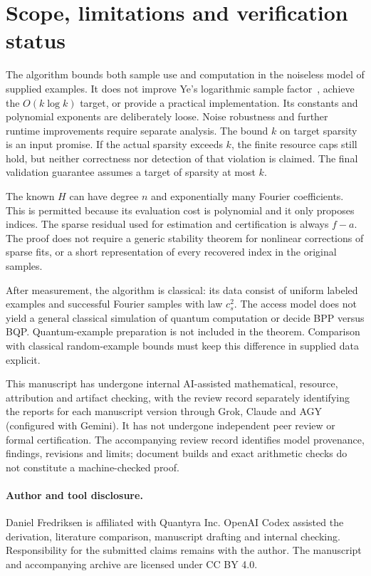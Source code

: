 \documentclass[11pt]{article}
\theoremstyle{remark}\newtheorem{remark}[theorem]{Remark}
\begin{document}
\section{Scope, limitations and verification status}
The algorithm bounds both sample use and computation in the noiseless model of supplied examples. It does not improve Ye's logarithmic sample factor~\cite{Ye}, achieve the $O(k\log k)$ target, or provide a practical implementation. Its constants and polynomial exponents are deliberately loose. Noise robustness and further runtime improvements require separate analysis. The bound $k$ on target sparsity is an input promise. If the actual sparsity exceeds $k$, the finite resource caps still hold, but neither correctness nor detection of that violation is claimed. The final validation guarantee assumes a target of sparsity at most $k$.

The known $H$ can have degree $n$ and exponentially many Fourier coefficients. This is permitted because its evaluation cost is polynomial and it only proposes indices. The sparse residual used for estimation and certification is always $f-a$. The proof does not require a generic stability theorem for nonlinear corrections of sparse fits, or a short representation of every recovered index in the original samples.

After measurement, the algorithm is classical: its data consist of uniform labeled examples and successful Fourier samples with law $c_s^2$. The access model does not yield a general classical simulation of quantum computation or decide BPP versus BQP. Quantum-example preparation is not included in the theorem. Comparison with classical random-example bounds must keep this difference in supplied data explicit.

This manuscript has undergone internal AI-assisted mathematical, resource, attribution and artifact checking, with the review record separately identifying the reports for each manuscript version through Grok, Claude and AGY (configured with Gemini). It has not undergone independent peer review or formal certification. The accompanying review record identifies model provenance, findings, revisions and limits; document builds and exact arithmetic checks do not constitute a machine-checked proof.

\paragraph{Author and tool disclosure.}
Daniel Fredriksen is affiliated with Quantyra Inc. OpenAI Codex assisted the derivation, literature comparison, manuscript drafting and internal checking. Responsibility for the submitted claims remains with the author. The manuscript and accompanying archive are licensed under CC BY 4.0.
\end{document}
